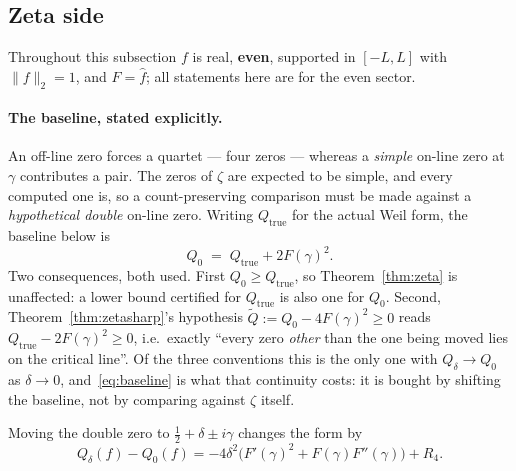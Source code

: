 \documentclass[11pt,a4paper]{article}
\theoremstyle{definition}
\theoremstyle{remark}
\begin{document}
\subsection{Zeta side}

Throughout this subsection $f$ is real, \textbf{even}, supported in $[-L,L]$ with
$\|f\|_2=1$, and $F=\hat f$; all statements here are for the even sector.

\paragraph{The baseline, stated explicitly.} An off-line zero forces a quartet --- four
zeros --- whereas a \emph{simple} on-line zero at $\gamma$ contributes a pair. The zeros of
$\zeta$ are expected to be simple, and every computed one is, so a count-preserving
comparison must be made against a \emph{hypothetical double} on-line zero. Writing
$Q_{\mathrm{true}}$ for the actual Weil form, the baseline below is
\begin{equation}\label{eq:baseline}
Q_0 \;=\; Q_{\mathrm{true}} + 2F(\gamma)^{2}.
\end{equation}
Two consequences, both used. First $Q_0\ge Q_{\mathrm{true}}$, so Theorem~\ref{thm:zeta} is
unaffected: a lower bound certified for $Q_{\mathrm{true}}$ is also one for $Q_0$. Second,
Theorem~\ref{thm:zetasharp}'s hypothesis $\widetilde Q:=Q_0-4F(\gamma)^{2}\ge0$ reads
$Q_{\mathrm{true}}-2F(\gamma)^{2}\ge0$, i.e.\ exactly ``every zero \emph{other} than the one
being moved lies on the critical line''. Of the three conventions this is the only one with
$Q_\delta\to Q_0$ as $\delta\to0$, and~\eqref{eq:baseline} is what that continuity costs: it
is bought by shifting the baseline, not by comparing against $\zeta$ itself.

Moving the double zero to $\tfrac12+\delta\pm i\gamma$ changes the form by
\begin{equation}\label{eq:pert}
Q_\delta(f)-Q_0(f)=-4\delta^{2}\bigl(F'(\gamma)^{2}+F(\gamma)F''(\gamma)\bigr)+R_4 .
\end{equation}
\end{document}
